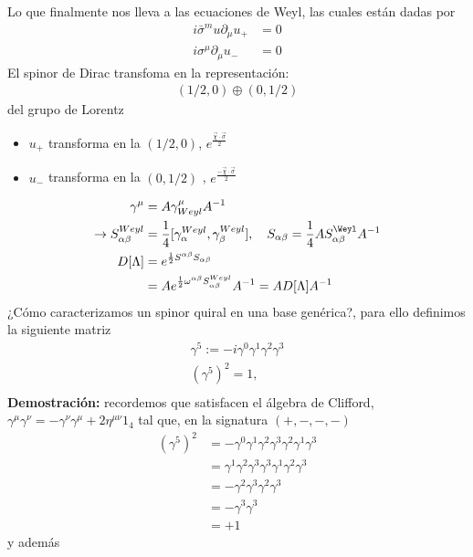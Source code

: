 \documentclass[../main.tex]{subfiles}
\begin{document}
Lo que finalmente nos lleva a las ecuaciones de Weyl, las cuales están dadas por
\begin{align*}
  i\bar{\sigma}^mu \partial_\mu u_+ & = 0 \\
  i\sigma^\mu \partial_\mu u_- & = 0
\end{align*}
El spinor de Dirac transfoma en la representación:
\begin{align*}
  \left( 1/2 , 0 \right) \oplus \left( 0,1/2 \right)
\end{align*}
del grupo de Lorentz
\begin{itemize}
  \item $u_+$ transforma en la $(1/2,0)$, $e^{\frac{\vec{\chi}\cdot \vec{\sigma}}{2}}$ 
  \item $u_-$ transforma en la $(0,1/2)$ , $e^{\frac{-\vec{\chi}\cdot \vec{\sigma}}{2}}$
\end{itemize}
\begin{align*}
  \gamma^\mu & = A \gamma^\mu_{Weyl} A^{-1} \\
  \rightarrow S^{Weyl}_{\alpha \beta} & = \frac{1}{4}[\gamma^{Weyl}_\alpha,\gamma^{Weyl}_\beta], \quad S_{\alpha \beta} = \frac{1}{4} A S^{\Weyl}_{\alpha \beta}A^{-1} \\
  D[\Lambda] & = e^{\frac{1}{2}S^{\alpha \beta}S_{\alpha \beta}} \\
  & = A e^{\frac{1}{2}\omega^{\alpha \beta}S_{\alpha\beta}^{Weyl}} A^{-1} =A D[\Lambda]  A^{-1}
\end{align*}
¿Cómo caracterizamos un spinor quiral en una base genérica?, para ello definimos la siguiente matriz
\begin{align*}
  \gamma^5 := -i\gamma^0\gamma^1\gamma^2\gamma^3 \\
  \left( \gamma^5 \right)^2 = 1, \\
\end{align*}
\textbf{Demostración:} recordemos que satisfacen el álgebra de Clifford, $\gamma^\mu \gamma^\nu = - \gamma^\nu \gamma^\mu + 2\eta^{\mu \nu}1_4$ tal que, en la signatura $(+,-,-,-)$
 \begin{align*}
   \left( \gamma^5 \right)^2 & = -\gamma^0 \gamma^1 \gamma^2\gamma^3\gamma^2\gamma^1\gamma^3 \\
   & = \gamma^1 \gamma^2\gamma^3\gamma^3\gamma^1\gamma^2\gamma^3 \\
   & = - \gamma^2\gamma^3\gamma^2\gamma^3 \\
   & = - \gamma^3 \gamma^3 \\
   & = +1
 \end{align*} 
 y además
\end{document}
